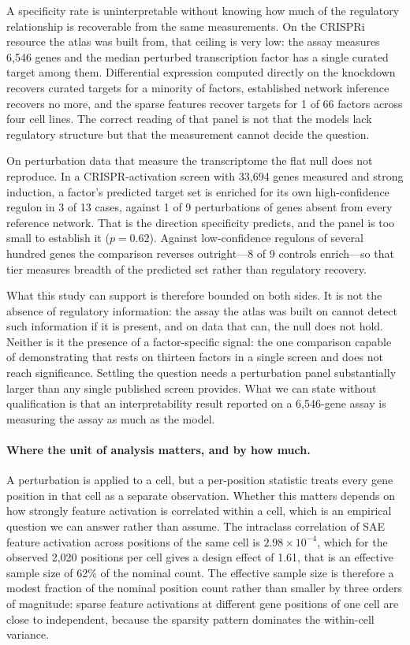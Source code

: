 A specificity rate is uninterpretable without knowing how much of the regulatory relationship is
recoverable from the same measurements. On the CRISPRi resource the atlas was built from, that
ceiling is very low: the assay measures 6,546 genes and the median perturbed transcription factor
has a single curated target among them. Differential expression computed directly on the knockdown
recovers curated targets for a minority of factors, established network inference recovers no more,
and the sparse features recover targets for 1 of 66 factors across four cell lines. The correct reading of that panel
is not that the models lack regulatory structure but that the measurement cannot decide the
question.

On perturbation data that measure the transcriptome the flat null does not reproduce. In a
CRISPR-activation screen with 33,694 genes measured and strong induction, a factor's predicted
target set is enriched for its own high-confidence regulon in 3 of 13 cases, against 1 of 9
perturbations of genes absent from every reference network. That is the direction specificity
predicts, and the panel is too small to establish it ($p = 0.62$). Against low-confidence regulons
of several hundred genes the comparison reverses outright---8 of 9 controls enrich---so that tier
measures breadth of the predicted set rather than regulatory recovery.

What this study can support is therefore bounded on both sides. It is not the absence of regulatory
information: the assay the atlas was built on cannot detect such information if it is present, and
on data that can, the null does not hold. Neither is it the presence of a factor-specific signal:
the one comparison capable of demonstrating that rests on thirteen factors in a single screen and
does not reach significance. Settling the question needs a perturbation panel substantially larger
than any single published screen provides. What we can state without qualification is that an
interpretability result reported on a 6,546-gene assay is measuring the assay as much as the
model.

\paragraph{Where the unit of analysis matters, and by how much.}
A perturbation is applied to a cell, but a per-position statistic treats every gene position in
that cell as a separate observation. Whether this matters depends on how strongly feature
activation is correlated within a cell, which is an empirical question we can answer rather than
assume. The intraclass correlation of SAE feature activation across positions of the same cell is
$2.98 \times 10^{-4}$, which for the observed 2,020 positions per cell gives a design
effect of 1.61, that is an effective sample size of 62\% of the nominal count. The effective sample size is therefore a modest fraction of the
nominal position count rather than smaller by three orders of magnitude: sparse feature activations
at different gene positions of one cell are close to independent, because the sparsity pattern
dominates the within-cell variance.

